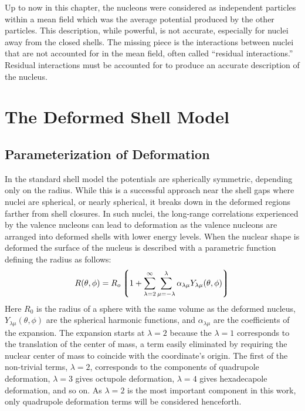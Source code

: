 Up to now in this chapter, the nucleons were considered as independent particles within a mean field which was the average potential produced by the other particles. This description, while powerful, is not accurate, especially for nuclei away from the closed shells. The missing piece is the interactions between nuclei that are not accounted for in the mean field, often called ``residual interactions.'' Residual interactions must be accounted for to produce an accurate description of the nucleus.

\section{The Deformed Shell Model}
\label{sec:models-shell-model-def-sm}
\subsection{Parameterization of Deformation}
\label{ssec:models-shell-model-def-param}
In the standard shell model the potentials are spherically symmetric, depending only on the radius. While this is a successful approach near the shell gaps where nuclei are spherical, or nearly spherical, it breaks down in the deformed regions farther from shell closures. In such nuclei, the long-range correlations experienced by the valence nucleons can lead to deformation as the valence nucleons are arranged into deformed shells with lower energy levels. When the nuclear shape is deformed the surface of the nucleus is described with a parametric function defining the radius as follows:
\begin{equation}
\label{eqn:surface-full-expansion}
R(\theta, \phi) = R_{o}\left \lgroup 1 + \sum_{\lambda = 2}^{\infty}\sum_{\mu = -\lambda}^{\lambda}\alpha_{\lambda \mu} Y_{\lambda \mu}(\theta, \phi)\right \rgroup
\end{equation} 
Here $R_0$ is the radius of a sphere with the same volume as the deformed nucleus, $Y_{\lambda \mu}(\theta, \phi)$ are the spherical harmonic functions, and $\alpha_{\lambda \mu}$ are the coefficients of the expansion. The expansion starts at $\lambda = 2$ because the $\lambda = 1$ corresponds to the translation of the center of mass, a term easily eliminated by requiring the nuclear center of mass to coincide with the coordinate's origin. The first of the non-trivial terms, $\lambda = 2$, corresponds to the components of quadrupole deformation, $\lambda = 3$ gives octupole deformation, $\lambda = 4$ gives hexadecapole deformation, and so on. As $\lambda = 2$ is the most important component in this work, only quadrupole deformation terms will be considered henceforth.

